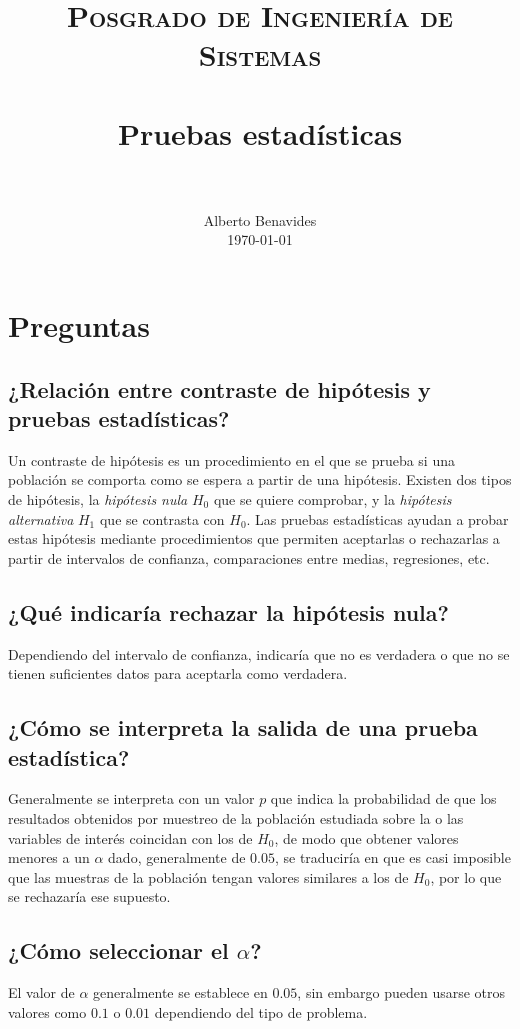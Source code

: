 \documentclass[paper=leter, fontsize=11pt]{scrartcl}
\title{
		\usefont{OT1}{bch}{b}{n}
		\normalfont \normalsize \textsc{Posgrado de Ingeniería de Sistemas} \\ [25pt]
		\horrule{0.5pt} \\[0.4cm]
		\huge Pruebas estadísticas \\
		\horrule{2pt} \\[0.5cm]
}
\author{
		\normalfont 								\normalsize
        Alberto Benavides\\[-3pt]		\normalsize
        \today
}
\date{}
\numberwithin{equation}{section}		%
\numberwithin{figure}{section}			%
\numberwithin{table}{section}				%
\begin{document}
\maketitle

\section{Preguntas}

\subsection{¿Relación entre contraste de hipótesis y pruebas estadísticas?}
Un contraste de hipótesis es un procedimiento en el que se prueba si una población se comporta como se espera a partir de una hipótesis. Existen dos tipos de hipótesis, la \emph{hipótesis nula} $H_0$ que se quiere comprobar, y la \emph{hipótesis alternativa} $H_1$ que se contrasta con $H_0$. Las pruebas estadísticas ayudan a probar estas hipótesis mediante procedimientos que permiten aceptarlas o rechazarlas a partir de intervalos de confianza, comparaciones entre medias, regresiones, etc.

\subsection{¿Qué indicaría rechazar la hipótesis nula?}
Dependiendo del intervalo de confianza, indicaría que no es verdadera o que no se tienen suficientes datos para aceptarla como verdadera.

\subsection{¿Cómo se interpreta la salida de una prueba estadística?}
Generalmente se interpreta con un valor $p$ que indica la probabilidad de que los resultados obtenidos por muestreo de la población estudiada sobre la o las variables de interés coincidan con los de $H_0$, de modo que obtener valores menores a un $\alpha$ dado, generalmente de $0.05$, se traduciría en que es casi imposible que las muestras de la población tengan valores similares a los de $H_0$, por lo que se rechazaría ese supuesto.

\subsection{¿Cómo seleccionar el $\alpha$?}
El valor de $\alpha$ generalmente se establece en $0.05$, sin embargo pueden usarse otros valores como $0.1$ o $0.01$ dependiendo del tipo de problema.
\end{document}

